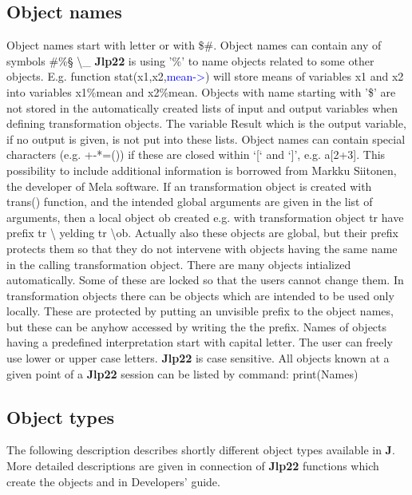 \subsection{Object names}
\label{onames}
Object names start with letter or with {\$\#}. Object names can contain any of
symbols {\#\%§ \textbackslash \_} \textbf{Jlp22} is using '\%' to name objects related to some other objects.
E.g. function \textcolor{VioletRed}{stat}(x1,x2,\textcolor{blue}{mean->}) will store means of variables x1 and x2 into
variables x1\%mean and x2\%mean. Objects with name starting with '\$' are not
stored in the automatically created lists of input and output variables when
defining transformation objects. The variable Result which
is the output variable, if no output is given, is not put into these lists.
Object names can contain special characters (e.g. +-*=()) if these are closed
within ‘[‘ and ‘]’, e.g. a[2+3]. This possibility to include additional information
is borrowed from Markku Siitonen, the developer of Mela software.
If an transformation object is created with \textcolor{VioletRed}{trans}() function, and the
intended global arguments are given in the list of arguments,
then a  local object {ob} created e.g. with transformation object {tr} have prefix
{tr \textbackslash } yelding {tr \textbackslash ob}. Actually also these objects are global, but their prefix
protects them so that they do not intervene with objects having the same name in the
calling transformation object.
There are many objects intialized automatically.
Some of these are locked so that the users cannot change them. In transformation objects
there can be objects which are intended to be used only locally. These are protected
by putting an unvisible prefix to the object names, but these can be anyhow accessed
by writing the the prefix.
Names of objects having a predefined interpretation start with capital letter.
The user can freely use lower or upper case letters. \textbf{Jlp22} is case sensitive.
All objects known at a given point of a \textbf{Jlp22} session can be listed by command:
\textcolor{VioletRed}{print}(Names)
\subsection{Object types}
\label{otypes}
The following description describes shortly different object types available in
\textbf{J}. More detailed descriptions are given in connection of \textbf{Jlp22} functions which
create the objects and in Developers' guide.
